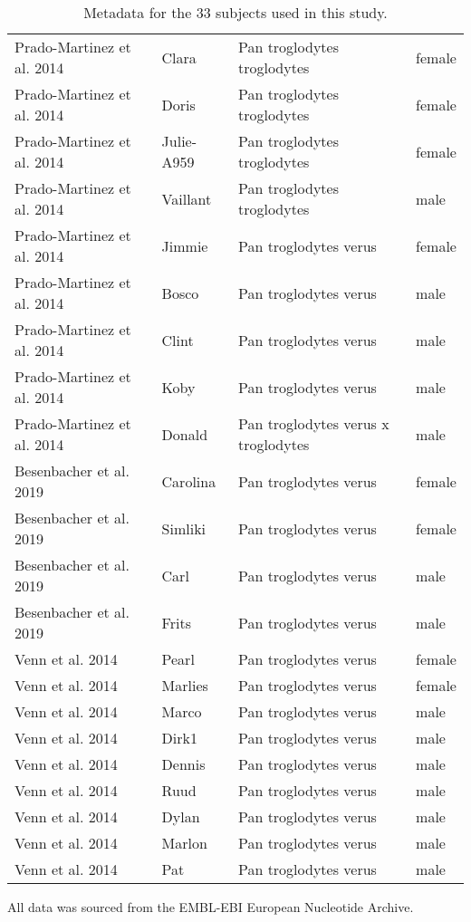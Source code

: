 \begin{table}[h]
\begin{tabular}{|l|l|l|l|}
Prado-Martinez et al. 2014  &  Clara  &  Pan troglodytes troglodytes  &  female  \\
Prado-Martinez et al. 2014  &  Doris  &  Pan troglodytes troglodytes  &  female  \\
Prado-Martinez et al. 2014  &  Julie-A959  &  Pan troglodytes troglodytes  &  female  \\
Prado-Martinez et al. 2014  &  Vaillant  &  Pan troglodytes troglodytes  &  male  \\
Prado-Martinez et al. 2014  &  Jimmie  &  Pan troglodytes verus  &  female  \\
Prado-Martinez et al. 2014  &  Bosco  &  Pan troglodytes verus  &  male  \\
Prado-Martinez et al. 2014  &  Clint  &  Pan troglodytes verus  &  male  \\
Prado-Martinez et al. 2014  &  Koby  &  Pan troglodytes verus  &  male  \\
Prado-Martinez et al. 2014  &  Donald  &  Pan troglodytes verus x troglodytes  &  male \\
Besenbacher et al. 2019  &  Carolina  &  Pan troglodytes verus  &  female  \\
Besenbacher et al. 2019  &  Simliki  &  Pan troglodytes verus  &  female  \\
Besenbacher et al. 2019  &  Carl  &  Pan troglodytes verus  &  male  \\
Besenbacher et al. 2019  &  Frits  &  Pan troglodytes verus  &  male  \\
Venn et al. 2014  &  Pearl  &  Pan troglodytes verus  &  female  \\
Venn et al. 2014  &  Marlies  &  Pan troglodytes verus  &  female  \\
Venn et al. 2014  &  Marco  &  Pan troglodytes verus  &  male  \\
Venn et al. 2014  &  Dirk1  &  Pan troglodytes verus  &  male  \\
Venn et al. 2014  &  Dennis  &  Pan troglodytes verus  &  male  \\
Venn et al. 2014  &  Ruud  &  Pan troglodytes verus  &  male  \\
Venn et al. 2014  &  Dylan  &  Pan troglodytes verus  &  male  \\
Venn et al. 2014  &  Marlon  &  Pan troglodytes verus  &  male  \\
Venn et al. 2014  &  Pat  &  Pan troglodytes verus  &  male  \\
\hline

\end{tabular}
\caption{\label{tab:subjects}Metadata for the 33 subjects used in this study.}
\end{table}

All data was sourced from the EMBL-EBI European Nucleotide Archive.